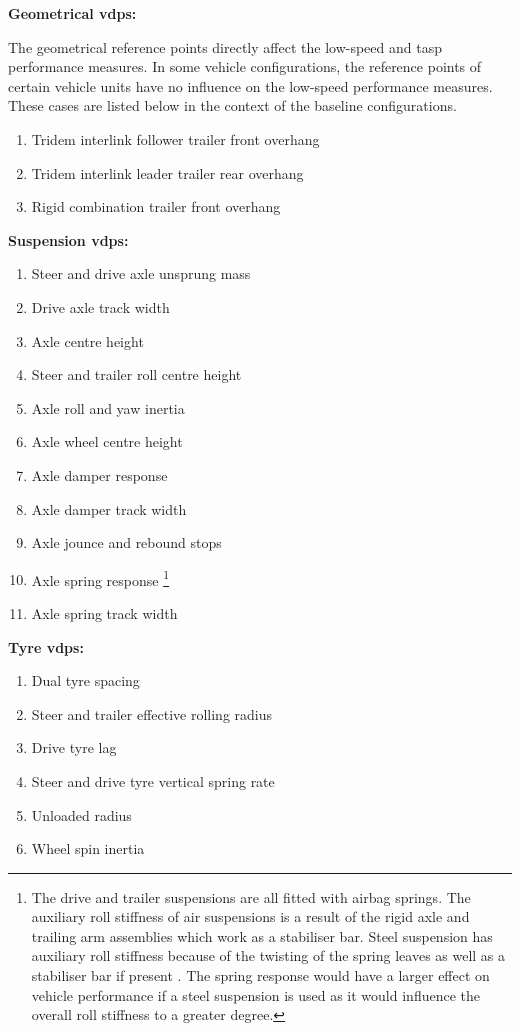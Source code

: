 \textbf{Geometrical \glspl{vdp}:}

The geometrical reference points directly affect the low-speed and \gls{tasp} performance measures. In some vehicle configurations, the reference points of certain vehicle units have no influence on the low-speed performance measures. These cases are listed below in the context of the baseline configurations.

\begin{enumerate}
	\item Tridem interlink follower trailer front overhang
	\item Tridem interlink leader trailer rear overhang
	\item Rigid combination trailer front overhang
\end{enumerate}

\textbf{Suspension \glspl{vdp}:}
\begin{enumerate}
	\item Steer and drive axle unsprung mass
	\item Drive axle track width
	\item Axle centre height
	\item Steer and trailer roll centre height
	\item Axle roll and yaw inertia
	\item Axle wheel centre height
	\item Axle damper response
	\item Axle damper track width
	\item Axle jounce and rebound stops
	\item Axle spring response \footnote{The drive and trailer suspensions are all fitted with airbag springs. The auxiliary roll stiffness of air suspensions is a result of the rigid axle and trailing arm assemblies which work as a stabiliser bar. Steel suspension has auxiliary roll stiffness because of the twisting of the spring leaves as well as a stabiliser bar if present \cite{Fu2002}. The spring response would have a larger effect on vehicle performance if a steel suspension is used as it would influence the overall roll stiffness to a greater degree.}
	\item Axle spring track width
\end{enumerate}

\textbf{Tyre \glspl{vdp}:}
\begin{enumerate}
	\item Dual tyre spacing
	\item Steer and trailer effective rolling radius
	\item Drive tyre lag
	\item Steer and drive tyre vertical spring rate
	\item Unloaded radius
	\item Wheel spin inertia
\end{enumerate}

